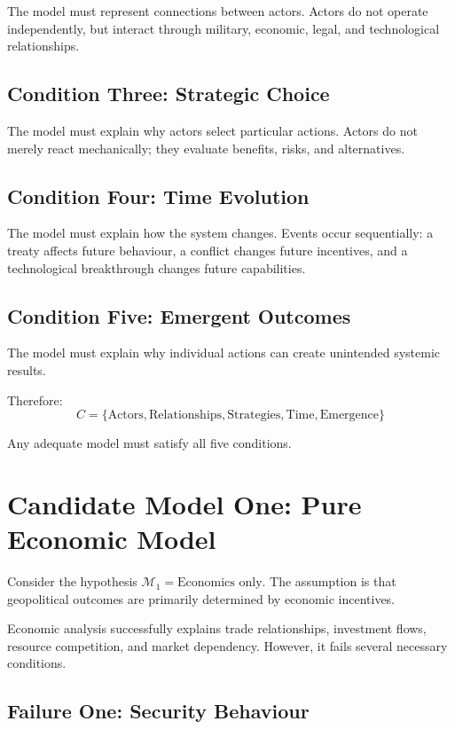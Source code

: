 \documentclass[11pt,openany]{book}
\theoremstyle{plain}
\theoremstyle{definition}
\begin{document}
The model must represent connections between actors. Actors do not operate independently, but interact through military, economic, legal, and technological relationships.

\subsection*{Condition Three: Strategic Choice}

The model must explain why actors select particular actions. Actors do not merely react mechanically; they evaluate benefits, risks, and alternatives.

\subsection*{Condition Four: Time Evolution}

The model must explain how the system changes. Events occur sequentially: a treaty affects future behaviour, a conflict changes future incentives, and a technological breakthrough changes future capabilities.

\subsection*{Condition Five: Emergent Outcomes}

The model must explain why individual actions can create unintended systemic results.

Therefore:
\[
\boxed{
C = \{\text{Actors}, \text{Relationships}, \text{Strategies}, \text{Time}, \text{Emergence}\}
}
\]

Any adequate model must satisfy all five conditions.

\section*{Candidate Model One: Pure Economic Model}

Consider the hypothesis \(\mathcal{M}_1 = \text{Economics only}\). The assumption is that geopolitical outcomes are primarily determined by economic incentives. 

Economic analysis successfully explains trade relationships, investment flows, resource competition, and market dependency. However, it fails several necessary conditions.

\subsection*{Failure One: Security Behaviour}
\end{document}
